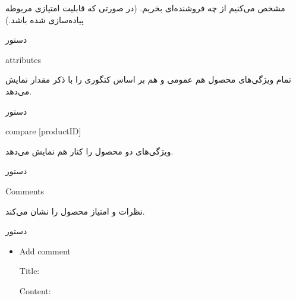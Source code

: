 \documentclass[]{article}
\begin{document}
مشخص می‌کنیم از چه فروشنده‌ای بخریم. (در صورتی که قابلیت امتیازی مربوطه پیاده‌سازی شده‌ باشد.)

\hrulefill

\begin{mybox}[colback=yellow]{دستور}

\begin{latin}

attributes

\end{latin}

\end{mybox}

تمام ویژگی‌های محصول هم عمومی و هم بر اساس کتگوری را با ذکر مقدار نمایش می‌دهد.


\hrulefill

\begin{mybox}[colback=yellow]{دستور}

\begin{latin}

compare  [productID]

\end{latin}

\end{mybox}

ویژگی‌های دو محصول را کنار هم نمایش می‌دهد.


\hrulefill

\begin{mybox}[colback=yellow]{دستور}

\begin{latin}

Comments

\end{latin}

\end{mybox}

نظرات و امتیاز محصول را نشان می‌کند.

\begin{mybox}[colback=brilliantlavender]{دستور}

\begin{latin}

\begin{itemize}[label = {$\Rightarrow$}]

\item
Add comment

Title:

Content:

\end{itemize}

\end{latin}

\end{mybox}
\end{document}
